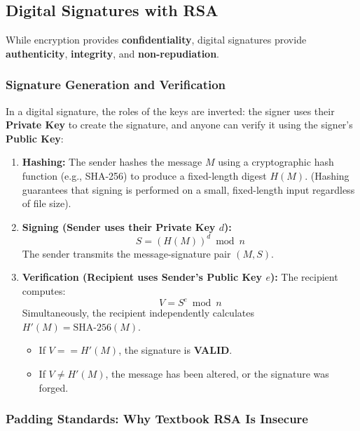 \subsection{Digital Signatures with RSA}

While encryption provides \textbf{confidentiality}, digital signatures provide \textbf{authenticity}, \textbf{integrity}, and \textbf{non-repudiation}.

\subsubsection{Signature Generation and Verification}

In a digital signature, the roles of the keys are inverted: the signer uses their \textbf{Private Key} to create the signature, and anyone can verify it using the signer's \textbf{Public Key}:

\begin{enumerate}
\item \textbf{Hashing:} The sender hashes the message $M$ using a cryptographic hash function (e.g., SHA-256) to produce a fixed-length digest $H(M)$. (Hashing guarantees that signing is performed on a small, fixed-length input regardless of file size).
\item \textbf{Signing (Sender uses their Private Key $d$):}
\[ S = (H(M))^d \bmod n \]
The sender transmits the message-signature pair $(M, S)$.
\item \textbf{Verification (Recipient uses Sender's Public Key $e$):}
The recipient computes:
\[ V = S^e \bmod n \]
Simultaneously, the recipient independently calculates $H'(M) = \text{SHA-256}(M)$.
\begin{itemize}
\item If $V == H'(M)$, the signature is \textbf{VALID}.
\item If $V \neq H'(M)$, the message has been altered, or the signature was forged.
\end{itemize}
\end{enumerate}

\subsubsection{Padding Standards: Why Textbook RSA Is Insecure}

